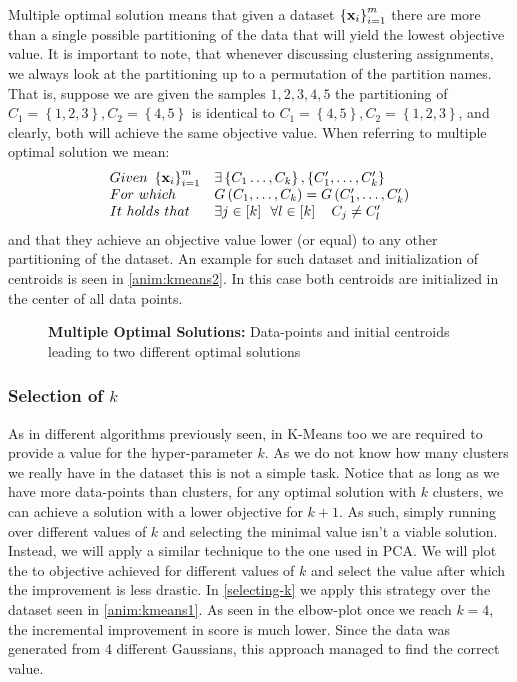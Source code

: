 Multiple optimal solution means that given a dataset $\left\{\mathbf{x}_i\right\}^m_{i=1}$ there are more than a single possible partitioning of the data that will yield the lowest objective value. It is important to note, that whenever discussing clustering assignments, we always look at the partitioning up to a permutation of the partition names. That is, suppose we are given the samples $1,2,3,4,5$ the partitioning of $C_1=\left\{1,2,3\right\},C_2=\left\{4,5\right\}$ is identical to $C_1=\left\{4,5\right\},C_2=\left\{1,2,3\right\}$, and clearly, both will achieve the same objective value. When referring to multiple optimal solution we mean:
$$
\begin{array}{ll}
Given \,\,\left\{\mathbf{x}_i\right\}^m_{i=1}  & \exists\left\{C_1\ldots,C_k\right\},\left\{C_1',\ldots,C_k'\right\} \\
For \,\, which & G\left(C_1,\ldots,C_k\right) = G\left(C_1',\ldots,C_k'\right)\\
It \,\, holds \,\, that & \exists j\in\left[k\right] \,\,\,\forall l\in\left[k\right]\quad C_j\neq C_l'
\end{array}
$$
and that they achieve an objective value lower (or equal) to any other partitioning of the dataset. An example for such dataset and initialization of centroids is seen in \autoref{anim:kmeans2}. In this case both centroids are initialized in the center of all data points.

\begin{figure}[h!]
	\centering
	\caption{\textbf{Multiple Optimal Solutions:} Data-points and initial centroids leading to two different optimal solutions}
	\label{anim:kmeans3}
\end{figure}



\subsubsection{Selection of $k$}
As in different algorithms previously seen, in K-Means too we are required to provide a value for the hyper-parameter $k$. As we do not know how many clusters we really have in the dataset this is not a simple task. Notice that as long as we have more data-points than clusters, for any optimal solution with $k$ clusters, we can achieve a solution with a lower objective for $k+1$. As such, simply running over different values of $k$ and selecting the minimal value isn't a viable solution. Instead, we will apply a similar technique to the one used in PCA. We will plot the to objective achieved for different values of $k$ and select the value after which the improvement is less drastic. In \autoref{selecting-k} we apply this strategy over the dataset seen in \autoref{anim:kmeans1}. As seen in the elbow-plot once we reach $k=4$, the incremental improvement in score is much lower. Since the data was generated from 4 different Gaussians, this approach managed to find the correct value.
	
